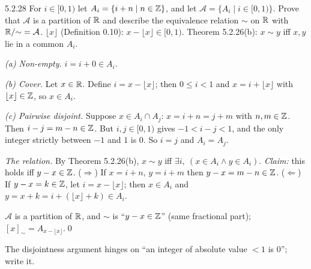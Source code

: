 \begin{bookex}[recommended]{5.2.28}
For $i\in[0,1)$ let $A_i=\{i+n\mid n\in\mathbb{Z}\}$, and let $\mathcal A=\{A_i\mid i\in[0,1)\}$. Prove that $\mathcal A$ is a partition of $\mathbb{R}$ and describe the equivalence relation $\sim$ on $\mathbb{R}$ with $\mathbb{R}/{\sim}=\mathcal A$.
\solution
\given $\lfloor x\rfloor$ (Definition 0.10): $x-\lfloor x\rfloor\in[0,1)$. Theorem 5.2.26(b): $x\sim y$ iff $x,y$ lie in a common $A_i$.
\begin{steps}
\item \emph{(a) Non-empty.} $i=i+0\in A_i$.
\item \emph{(b) Cover.} Let $x\in\mathbb{R}$. Define $i=x-\lfloor x\rfloor$; then $0\le i<1$  and $x=i+\lfloor x\rfloor$ with $\lfloor x\rfloor\in\mathbb{Z}$, so $x\in A_i$.
\item \emph{(c) Pairwise disjoint.} Suppose $x\in A_i\cap A_j$: $x=i+n=j+m$ with $n,m\in\mathbb{Z}$. Then $i-j=m-n\in\mathbb{Z}$. But $i,j\in[0,1)$ gives $-1<i-j<1$, and the only integer strictly between $-1$ and $1$ is $0$. So $i=j$ and $A_i=A_j$.
\item \emph{The relation.} By Theorem 5.2.26(b), $x\sim y$ iff $\exists i,\ (x\in A_i\wedge y\in A_i)$. \emph{Claim:} this holds iff $y-x\in\mathbb{Z}$. ($\Rightarrow$) If $x=i+n$, $y=i+m$ then $y-x=m-n\in\mathbb{Z}$. ($\Leftarrow$) If $y-x=k\in\mathbb{Z}$, let $i=x-\lfloor x\rfloor$; then $x\in A_i$ and $y=x+k=i+(\lfloor x\rfloor+k)\in A_i$.
\end{steps}
\conclusion $\mathcal A$ is a partition of $\mathbb{R}$, and $\sim$ is ``$y-x\in\mathbb{Z}$'' (same fractional part); $[x]_\sim=A_{x-\lfloor x\rfloor}$.\qed
\begin{compare}
\item The disjointness argument hinges on ``an integer of absolute value $<1$ is $0$''; write it.
\end{compare}
\end{bookex}

